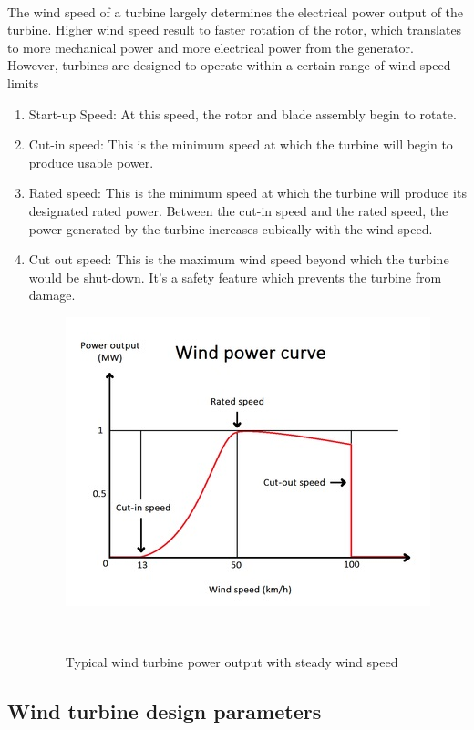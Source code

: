 \documentclass[titlepage]{article}
\begin{document}
\paragraph{} The wind speed of a turbine largely determines the electrical power output of the turbine. Higher wind speed result to faster rotation of the rotor, which translates to more mechanical power and more electrical power from the generator. However, turbines are designed to operate within a certain range of wind speed limits
\begin{enumerate}
    \item Start-up Speed: At this speed, the rotor and blade assembly begin to rotate.
    \item Cut-in speed: This is the minimum speed at which the turbine will begin to produce usable power. 
    \item Rated speed: This is the minimum speed at which the turbine will produce its designated rated power. Between the cut-in speed and the rated speed, the power generated by the turbine increases cubically with the wind speed.
    \item Cut out speed: This is the maximum wind speed beyond which the turbine would be shut-down. It's a safety feature which prevents the turbine from damage.
    
\begin{figure}[h!]
\centering
\includegraphics[scale=0.8]{Windspeedcurve.jpg}
\caption{Typical wind turbine power output with steady wind speed}~\cite{windpowerprogramwebsite}
\label{Windspeedcurve}
\end{figure}
    
\end{enumerate}
\subsection{Wind turbine design parameters}
\end{document}
